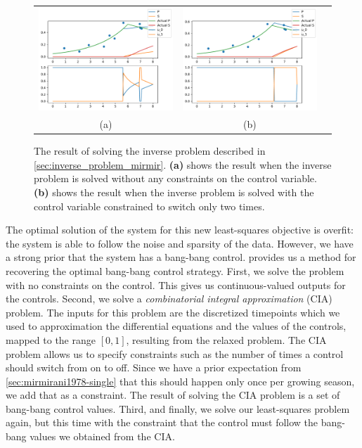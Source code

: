 \documentclass{article}
\begin{document}
\begin{figure}
  \centering
  \begin{tabular}{ccc}
    \includegraphics[width=3in]{imgs/Mirmirani_inverse_bad_fit.pdf} &
    \includegraphics[width=3in]{imgs/Mirmirani_inverse_good_fit.pdf} \\
    (a) & (b)
  \end{tabular}
  \caption{The result of solving the inverse problem described in \autoref{sec:inverse_problem_mirmir}. \textbf{(a)} shows the result when the inverse problem is solved without any constraints on the control variable. \textbf{(b)} shows the result when the inverse problem is solved with the control variable constrained to switch only two times. \label{fig:mirmir-fit}}
\end{figure}

The optimal solution of the system for this new least-squares objective is overfit: the system is able to follow the noise and sparsity of the data. However, we have a strong prior that the system has a bang-bang control. \citet{Burger2020} provides us a method for recovering the optimal bang-bang control strategy. First, we solve the problem with no constraints on the control. This gives us continuous-valued outputs for the controls. Second, we solve a \textit{combinatorial integral approximation} (CIA) problem. The inputs for this problem are the discretized timepoints which we used to approximation the differential equations and the values of the controls, mapped to the range $[0,1]$, resulting from the relaxed problem. The CIA problem allows us to specify constraints such as the number of times a control should switch from on to off. Since we have a prior expectation from \autoref{sec:mirmirani1978-single} that this should happen only once per growing season, we add that as a constraint. The result of solving the CIA problem is a set of bang-bang control values. Third, and finally, we solve our least-squares problem again, but this time with the constraint that the control must follow the bang-bang values we obtained from the CIA.
\end{document}
